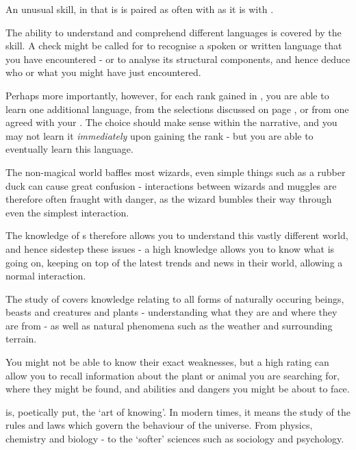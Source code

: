 An unusual  skill, in that is is paired as often with  as it is with .


The ability to understand and comprehend different languages is covered by the  skill. A  check might be called for to recognise a spoken or written language that you have encountered - or to analyse its structural components, and hence deduce who or what you might have just encountered.

Perhaps more importantly, however, for each rank gained in , you are able to learn one additional language, from the selections discussed on page \pageref{S:Languages}, or from one agreed with your . The choice should make sense within the narrative, and you may not learn it {\it immediately} upon gaining the rank - but you are able to eventually learn this language. 


The non-magical world baffles most wizards, even simple things such as a rubber duck can cause great confusion - interactions between wizards and muggles are therefore often fraught with danger, as the wizard bumbles their way through even the simplest interaction. 

The knowledge of s therefore allows you to understand this vastly different world, and hence sidestep these issues - a high  knowledge allows you to know what is going on, keeping on top of the latest trends and news in their world, allowing a normal interaction.


The study of  covers knowledge relating to all forms of naturally occuring beings, beasts and creatures and plants - understanding what they are and where they are from - as well as natural phenomena such as the weather and surrounding terrain.

You might not be able to know their exact weaknesses, but a high  rating can allow you to recall information about the plant or animal you are searching for, where they might be found, and abilities and dangers you might be about to face. 


 is, poetically put, the `art of knowing'. In modern times, it means the study of the rules and laws which govern the behaviour of the universe. From physics, chemistry and biology - to the `softer' sciences such as sociology and psychology. 

